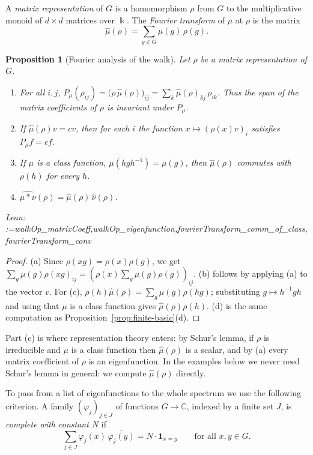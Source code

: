 \documentclass[11pt]{amsart}
\makeatletter
\newtheorem{proposition}[theorem]{Proposition}
\theoremstyle{definition}
\theoremstyle{remark}
\newcommand{\@leanlist}[1]{\def\@leansep{}\@for\@leanname:=#1\do{\@leansep
  \texttt{\expandafter\detokenize\expandafter{\@leanname}}\def\@leansep{, }}}
\newcommand{\lean}[1]{\par\smallskip\noindent
  {\footnotesize\normalfont\raggedright\textsf{Lean:} \@leanlist{#1}\par}}
\newcommand{\C}{\mathbb{C}}
\newcommand{\one}{\mathbf{1}}
\makeatother
\begin{document}
A \emph{matrix representation} of $G$ is a homomorphism $\rho$ from $G$ to the multiplicative
monoid of $d\times d$ matrices over $\Bbbk$.  The \emph{Fourier transform} of $\mu$ at $\rho$ is
the matrix
\[
  \hat\mu(\rho)=\sum_{g\in G}\mu(g)\,\rho(g).
\]

\begin{proposition}[Fourier analysis of the walk]\label{prop:finite-fourier}
Let $\rho$ be a matrix representation of $G$.
\begin{enumerate}
\item[(a)] For all $i,j$, $P_\mu(\rho_{ij})=\bigl(\rho\,\hat\mu(\rho)\bigr)_{ij}
=\sum_k\hat\mu(\rho)_{kj}\,\rho_{ik}$.  Thus the span of the matrix coefficients of $\rho$ is
invariant under $P_\mu$.
\item[(b)] If $\hat\mu(\rho)v=cv$, then for each $i$ the function $x\mapsto(\rho(x)v)_i$
satisfies $P_\mu f=cf$.
\item[(c)] If $\mu$ is a class function, $\mu(hgh^{-1})=\mu(g)$, then $\hat\mu(\rho)$ commutes
with $\rho(h)$ for every $h$.
\item[(d)] $\widehat{\mu*\nu}(\rho)=\hat\mu(\rho)\,\hat\nu(\rho)$.
\end{enumerate}
\lean{walkOp_matrixCoeff,walkOp_eigenfunction,fourierTransform_comm_of_class,fourierTransform_conv}
\end{proposition}

\begin{proof}
(a) Since $\rho(xg)=\rho(x)\rho(g)$, we get
$\sum_g\mu(g)\rho(xg)_{ij}=(\rho(x)\sum_g\mu(g)\rho(g))_{ij}$.  (b) follows by applying (a) to
the vector $v$.  For (c), $\rho(h)\hat\mu(\rho)=\sum_g\mu(g)\rho(hg)$; substituting
$g\mapsto h^{-1}gh$ and using that $\mu$ is a class function gives $\hat\mu(\rho)\rho(h)$.  (d)
is the same computation as Proposition~\ref{prop:finite-basic}(d).
\end{proof}

Part (c) is where representation theory enters: by Schur's lemma, if $\rho$ is irreducible and
$\mu$ is a class function then $\hat\mu(\rho)$ is a scalar, and by (a) every matrix coefficient
of $\rho$ is an eigenfunction.  In the examples below we never need Schur's lemma in general: we
compute $\hat\mu(\rho)$ directly.

To pass from a list of eigenfunctions to the whole spectrum we use the following criterion.  A
family $(\varphi_j)_{j\in J}$ of functions $G\to\C$, indexed by a finite set $J$, is
\emph{complete with constant $N$} if
\begin{equation}\label{eq:complete}
  \sum_{j\in J}\varphi_j(x)\,\overline{\varphi_j(y)}=N\cdot\one_{x=y}\qquad\text{for all }x,y\in G.
\end{equation}
\end{document}
